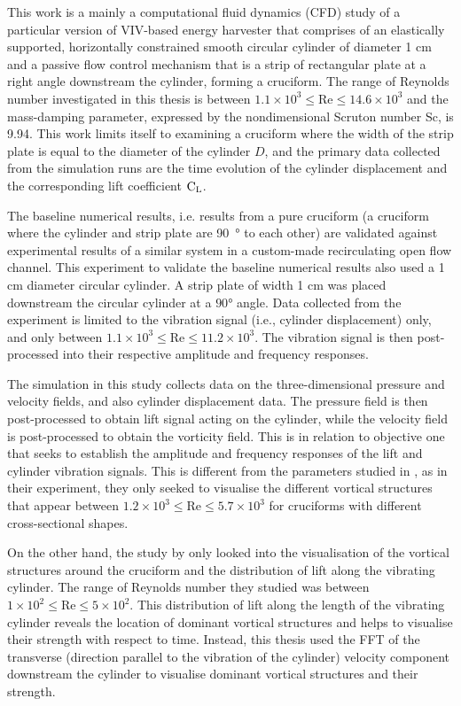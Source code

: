 \documentclass[oneside]{utmthesis}
\begin{document}
\vspace{\baselineskip}

This work is a mainly a computational fluid dynamics (CFD) study of a particular version of VIV-based energy harvester that comprises of an elastically supported, horizontally constrained smooth circular cylinder of diameter 1 cm and a passive flow control mechanism that is a strip of rectangular plate at a right angle downstream the cylinder, forming a cruciform. The range of Reynolds number investigated in this thesis is between $1.1 \times 10^{3} \leq \text{Re} \leq 14.6 \times 10^{3}$ and the mass-damping parameter, expressed by the nondimensional Scruton number Sc, is 9.94. This work limits itself to examining a cruciform where the width of the strip plate is equal to the diameter of the cylinder $D$, and the primary data collected from the simulation runs are the time evolution of the cylinder displacement and the corresponding lift coefficient $\text{C}_{\text{L}}$.

The baseline numerical results, i.e. results from a pure cruciform (a cruciform where the cylinder and strip plate are \SI{90}{\degree} to each other) are validated against experimental results of a similar system in a custom-made recirculating open flow channel. This experiment to validate the baseline numerical results also used a 1 cm diameter circular cylinder. A strip plate of width 1 cm was placed downstream the circular cylinder at a $90 \si{\degree}$ angle. Data collected from the experiment is limited to the vibration signal (i.e., cylinder displacement) only, and only between $1.1 \times 10^{3} \leq \text{Re} \leq 11.2 \times 10^{3}$. The vibration signal is then post-processed into their respective amplitude and frequency responses.

The simulation in this study collects data on the three-dimensional pressure and velocity fields, and also cylinder displacement data. The pressure field is then post-processed to obtain lift signal acting on the cylinder, while the velocity field is post-processed to obtain the vorticity field. This is in relation to objective one that seeks to establish the amplitude and frequency responses of the lift and cylinder vibration signals. This is different from the parameters studied in \citet{Koide2017}, as in their experiment, they only seeked to visualise the different vortical structures that appear between $1.2 \times 10^{3} \leq \text{Re} \leq 5.7 \times 10^{3}$ for cruciforms with different cross-sectional shapes.

On the other hand, the study by \citet{Zhao2018a} only looked into the visualisation of the vortical structures around the cruciform and the distribution of lift along the vibrating cylinder. The range of Reynolds number they studied was between $1 \times 10^{2} \leq \text{Re} \leq 5 \times 10^{2}$. This distribution of lift along the length of the vibrating cylinder reveals the location of dominant vortical structures and helps to visualise their strength with respect to time. Instead, this thesis used the FFT of the transverse (direction parallel to the vibration of the cylinder) velocity component downstream the cylinder to visualise dominant vortical structures and their strength.
\end{document}
